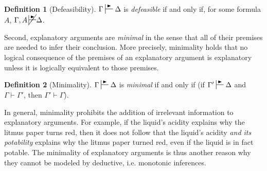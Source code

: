 \documentclass{article}
\theoremstyle{definition}
\theoremstyle{definition}
\theoremstyle{definition}
\theoremstyle{definition}
\newtheorem{definition}{Definition}
\theoremstyle{remark}
\theoremstyle{definition}
\theoremstyle{definition}
\begin{document}
\begin{definition}[Defeasibility]\label{def:defeasibility}
	$ \Gamma\sststile{}{\RHD}\Delta  $ is \textit{defeasible} if and only if, for some formula $ A $, $ \Gamma, A \, \cancel{\sststile{}{\RHD}}\Delta  $.
\end{definition}

Second, explanatory arguments are \textit{minimal} in the sense that all of their premises are needed to infer their conclusion. More precisely, minimality holds that no logical consequence of the premises of an explanatory argument is explanatory unless it is logically equivalent to those premises.

\begin{definition}[Minimality]\label{def:minimality}
	$ \Gamma\sststile{}{\RHD}\Delta  $ is \textit{minimal} if and only if (if $ \Gamma'\sststile{}{\RHD}\Delta $ and $ \Gamma \vdash \Gamma' $, then $ \Gamma' \vdash \Gamma $).
\end{definition}


In general, minimality prohibits the addition of irrelevant information to explanatory arguments. For example, if the liquid's acidity explains why the litmus paper turns red, then it does not follow that the liquid's acidity \textit{and its potability} explains why the litmus paper turned red, even if the liquid is in fact potable. The minimality of explanatory arguments is thus another reason why they cannot be modeled by deductive, i.e. monotonic inferences. 
\end{document}
